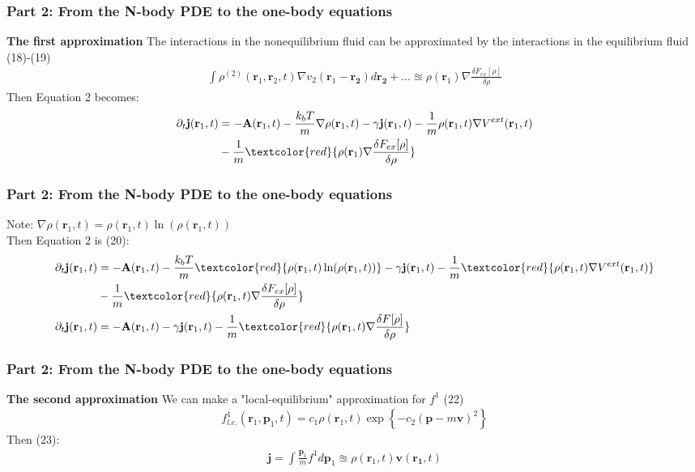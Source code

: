 \documentclass[aspectratio=169,xcolor=dvipsnames]{beamer}
\begin{document}
\begin{frame}
	\frametitle{Part 2: From the N-body PDE to the one-body equations}
\textbf{The first approximation}
The interactions in the nonequilibrium fluid can be approximated by the interactions in the equilibrium fluid (18)-(19)
\begin{align*}
\int \rho^{(2)}(\mathbf{r}_1, \mathbf{r}_2,t) \nabla v_2(\mathbf{r}_1 - \mathbf{r_2}) d \mathbf{r_2} + ... \approxeq \rho(\mathbf{r}_1)\nabla \frac{\delta F_{ex}[\rho]}{\delta \rho}
\end{align*}
Then Equation 2 becomes:
\begin{align*}
\partial_t \mathbf{j}(\mathbf{r}_1,t) &= -{\mathbf{A}(\mathbf{r}_1,t)}  -\frac{k_bT}{m} \nabla \rho (\mathbf{r}_1,t)- \gamma \mathbf{j}(\mathbf{r}_1,t) -\frac{1}{m} \rho(\mathbf{r}_1,t) \nabla V^{ext}(\mathbf{r}_1,t) \\
&- \frac{1}{m} \textcolor{red}{\rho(\mathbf{r}_1)\nabla \frac{\delta F_{ex}[\rho]}{\delta \rho}}
\end{align*}
\end{frame}
\begin{frame}
	\frametitle{Part 2: From the N-body PDE to the one-body equations}
	Note: $	\nabla \rho (\mathbf{r}_1,t) = \rho (\mathbf{r}_1,t) \ln(\rho (\mathbf{r}_1,t))$\\
	\vspace{0.2cm}
	Then Equation 2 is (20):
	\begin{align*}
	\partial_t \mathbf{j}(\mathbf{r}_1,t) &= - {\mathbf{A}(\mathbf{r}_1,t)}  -\frac{k_bT}{m} \textcolor{red}{ \rho (\mathbf{r}_1,t) \ln (\rho (\mathbf{r}_1,t)) }- \gamma \mathbf{j}(\mathbf{r}_1,t) -\frac{1}{m}\textcolor{red}{ \rho(\mathbf{r}_1,t) \nabla V^{ext}(\mathbf{r}_1,t)} \\
	&- \frac{1}{m} \textcolor{red}{\rho(\mathbf{r}_1,t)\nabla \frac{\delta F_{ex}[\rho]}{\delta \rho}}\\		
	\partial_t \mathbf{j}(\mathbf{r}_1,t) &= -{\mathbf{A}(\mathbf{r}_1,t)}  - \gamma \mathbf{j}(\mathbf{r}_1,t)
	- \frac{1}{m} \textcolor{red}{ \rho(\mathbf{r}_1,t)\nabla \frac{\delta F[\rho]}{\delta \rho}}
	\end{align*}
\end{frame}
\begin{frame}
	\frametitle{Part 2: From the N-body PDE to the one-body equations}
	\textbf{The second approximation} We can make a "local-equilibrium" approximation for $f^1$ (22)
	\begin{align*}
	f^1_{l.e.}(\mathbf{r}_1, \mathbf{p}_1,t) = c_1 \rho(\mathbf{r}_1,t)\exp{\left\{- c_2\left(\mathbf{p} - m \mathbf{v}\right)^2\right\}}
	\end{align*}
	Then (23):
	\begin{align*}
	\mathbf{j}=  \int \frac{\mathbf{p}_1}{m}f^1 d \mathbf{p}_1 \approxeq \rho(\mathbf{r}_1,t) \mathbf{v}(\mathbf{r_1},t)
	\end{align*}
\end{frame}
\end{document}

